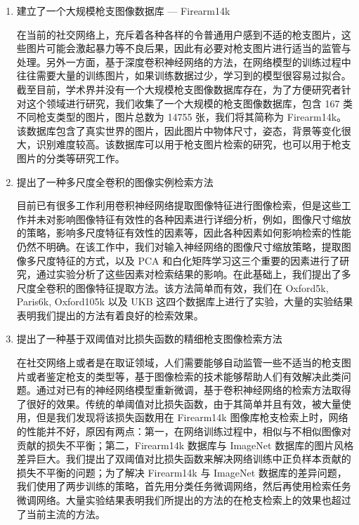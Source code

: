 \begin{enumerate}
\item 建立了一个大规模枪支图像数据库 --- Firearm14k

在当前的社交网络上，充斥着各种各样的令普通用户感到不适的枪支图片，这些图片可能会激起暴力等不良后果，因此有必要对枪支图片进行适当的监管与处理。另外一方面，基于深度卷积神经网络的方法，在网络模型的训练过程中往往需要大量的训练图片，如果训练数据过少，学习到的模型很容易过拟合。截至目前，学术界并没有一个大规模枪支图像数据库存在，为了方便研究者针对这个领域进行研究，我们收集了一个大规模的枪支图像数据库，包含 167 类不同枪支类型的图片，图片总数为 14755 张，我们将其简称为 Firearm14k。该数据库包含了真实世界的图片，因此图片中物体尺寸，姿态，背景等变化很大，识别难度较高。该数据库可以用于枪支图片检索的研究，也可以用于枪支图片的分类等研究工作。

\item 提出了一种多尺度全卷积的图像实例检索方法

目前已有很多工作利用卷积神经网络提取图像特征进行图像检索，但是这些工作并未对影响图像特征有效性的各种因素进行详细分析，例如，图像尺寸缩放的策略，影响多尺度特征有效性的因素等，因此各种因素如何影响检索的性能仍然不明确。在该工作中，我们对输入神经网络的图像尺寸缩放策略，提取图像多尺度特征的方式，以及 PCA 和白化矩阵学习这三个重要的因素进行了研究，通过实验分析了这些因素对检索结果的影响。在此基础上，我们提出了多尺度全卷积的图像特征提取方法。该方法简单而有效，我们在 Oxford5k, Paris6k, Oxford105k 以及 UKB 这四个数据库上进行了实验，大量的实验结果表明我们提出的方法有着良好的检索效果。

\item 提出了一种基于双阈值对比损失函数的精细枪支图像检索方法

在社交网络上或者是在取证领域，人们需要能够自动监管一些不适当的枪支图片或者鉴定枪支的类型等，基于图像检索的技术能够帮助人们有效解决此类问题。通过对已有的神经网络模型重新微调，基于卷积神经网络的检索方法取得了很好的效果。传统的单阈值对比损失函数，由于其简单并且有效，被大量使用，但是我们发现将该损失函数用在 Firearm14k 图像库枪支检索上时，网络的性能并不好，原因有两点：第一，在网络训练过程中，相似与不相似图像对贡献的损失不平衡；第二，Firearm14k 数据库与 ImageNet 数据库的图片风格差异巨大。我们提出了双阈值对比损失函数来解决网络训练中正负样本贡献的损失不平衡的问题；为了解决 Firearm14k 与 ImageNet 数据库的差异问题，我们使用了两步训练的策略，首先用分类任务微调网络，然后再使用检索任务微调网络。大量实验结果表明我们所提出的方法的在枪支检索上的效果也超过了当前主流的方法。

\end{enumerate}


